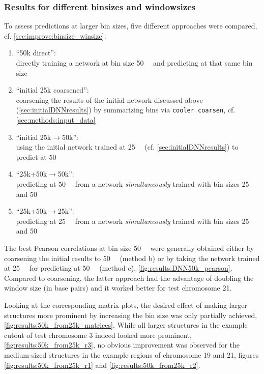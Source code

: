 \subsubsection{Results for different binsizes and windowsizes} \label{sec:results:binsize_winsize}
To assess predictions at larger bin sizes, five different approaches were compared, cf. \cref{sec:improve:binsize_winsize}:
\begin{enumerate}
 \item ``50k direct'': \\directly training a network at bin size \SI{50}{\kilo\bp} and predicting at that same bin size
 \item ``initial 25k coarsened'': \\coarsening the results of the initial network discussed above (\cref{sec:initialDNNresults})
                    by summarizing bins via \texttt{cooler coarsen}, cf. \cref{sec:methods:input_data}
 \item ``initial 25k$\rightarrow$50k'': \\using the initial network trained at \SI{25}{\kilo\bp} (cf. \cref{sec:initialDNNresults}) to predict at \SI{50}{\kilo\bp}
 \item ``25k+50k$\rightarrow$50k'': \\predicting at \SI{50}{\kilo\bp} from a network \emph{simultaneously} trained with bin sizes 25 and \SI{50}{\kilo\bp}
 \item ``25k+50k$\rightarrow$25k'': \\predicting at \SI{25}{\kilo\bp} from a network \emph{simultaneously} trained with bin sizes 25 and \SI{50}{\kilo\bp}
\end{enumerate}

The best Pearson correlations at bin size \SI{50}{\kilo\bp} were generally obtained either by coarsening the initial results to \SI{50}{\kilo\bp} 
(method b) or by taking the network trained at \SI{25}{\kilo\bp} for predicting at \SI{50}{\kilo\bp} (method c), \cref{fig:results:DNN50k_pearson}.
Compared to coarsening, the latter approach had the advantage of doubling the window size (in base pairs) and it worked better for test chromosome 21.

Looking at the corresponding matrix plots, the desired effect of making larger structures more prominent by increasing the bin size was only partially achieved, \cref{fig:results:50k_from25k_matrices}.
While all larger structures in the example cutout of test chromosome 3 indeed looked more prominent, \cref{fig:results:50k_from25k_r3},
no obvious improvement was observed for the medium-sized structures in the example regions of chromosome 19 and 21, 
figures \ref{fig:results:50k_from25k_r1} and \ref{fig:results:50k_from25k_r2}.

